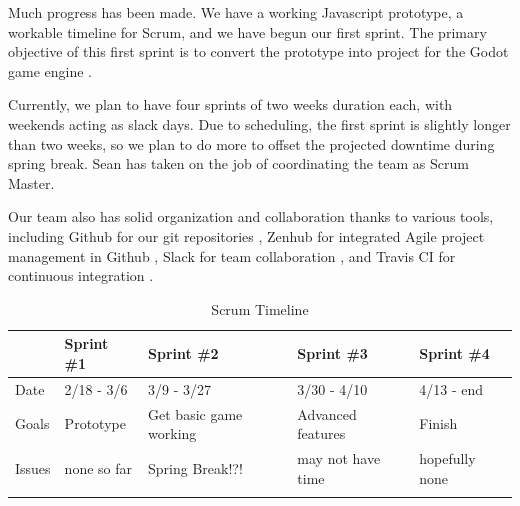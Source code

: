 \documentclass[12pt]{article}
\begin{document}
Much progress has been made. We have a working Javascript prototype, a 
workable timeline for Scrum, and we have begun our first sprint. The 
primary objective of this first sprint is to convert the prototype 
into project for the Godot game engine \cite{godot:gameengine}. 

Currently, we plan to have four sprints of two weeks duration each, 
with weekends acting as slack days. Due to scheduling, the first 
sprint is slightly longer than two weeks, so we plan to do more to 
offset the projected downtime during spring break. Sean has taken on the job of coordinating the team as Scrum Master.

Our team also has solid organization and collaboration thanks to various tools, including Github for our git repositories \cite{github:site}, Zenhub for integrated Agile project management in Github \cite{zenhub:site}, Slack for team collaboration \cite{slack:site}, and Travis CI for continuous integration \cite{travis:site}. 


\begin{table}[h]
\centering
\begin{tabular}{|l|l|l|l|l|}
\hline
& Sprint \#1 & Sprint \#2 & Sprint \#3 & Sprint \#4 \\ \hline
Date & 2/18 - 3/6 & 3/9 - 3/27 & 3/30 - 4/10 & 4/13 - end \\ \hline
Goals & Prototype & Get basic game working & Advanced features & Finish \\ \hline
Issues & none so far & Spring Break!?! & may not have time & hopefully none \\ \hline
&  &  &  &  \\ \hline
\end{tabular}
\caption{Scrum Timeline}
\label{timeline}
\end{table}




\end{document}
